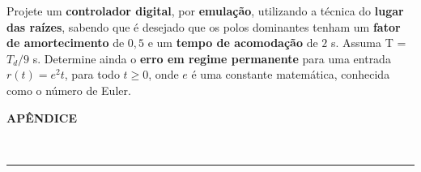 \documentclass{yagoexam}
\begin{document}
\begin{questions}
    Projete um \textbf{controlador digital}, por \textbf{emulação}, utilizando a técnica do \textbf{lugar das raízes}, sabendo que é desejado que os polos dominantes tenham um \textbf{fator de amortecimento} de $0,5$ e um \textbf{tempo de acomodação} de $2$ s. Assuma T = $T_d/9$ s. Determine ainda o \textbf{erro em regime permanente} para uma entrada $r(t) = e^2  t$, para todo $t \geq 0$, onde $e$ é uma constante matemática, conhecida como o número de Euler.
    
    
    \newpage
    
    \mbox{}

    \newpage
    
    \mbox{}

    \newpage
    
\end{questions}
    
        \begin{minipage}{2in}
{\selectfont
{\LARGE \textbf{APÊNDICE}} 
}
\end{minipage}
\hfill
\begin{minipage}{1.3in}
{\selectfont
{\LARGE \textbf{}} 
}
\end{minipage}
\\ \rule[0.5ex]{\textwidth}{1.2pt}
\vspace{0.1cm}
\end{document}
